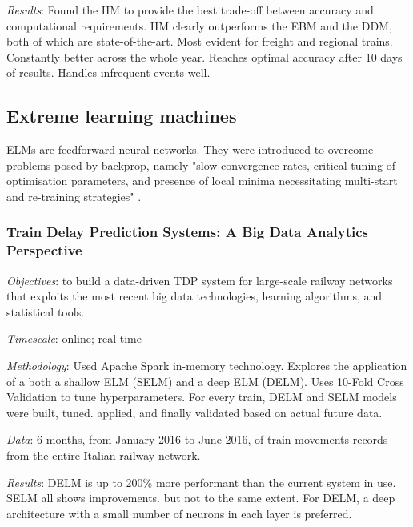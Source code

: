 \documentclass{article}
\begin{document}
\smallskip

\textit{Results}: Found the HM to provide the best trade-off between accuracy and computational requirements. HM clearly outperforms the EBM and the DDM, both of which are state-of-the-art. Most evident for freight and regional trains. Constantly better across the whole year. Reaches optimal accuracy after 10 days of results. Handles infrequent events well. 

\subsection{Extreme learning machines}

ELMs are feedforward neural networks. They were introduced to overcome problems posed by backprop, namely "slow convergence rates, critical tuning of optimisation parameters, and presence of local minima necessitating multi-start and re-training strategies" \cite{oneto_et_al_2017a}.

\subsubsection{Train Delay Prediction Systems: A Big Data Analytics Perspective \cite{oneto_et_al_2017a}}

\textit{Objectives}: to build a data-driven TDP system for large-scale railway networks that exploits the most recent big data technologies, learning algorithms, and statistical tools. 

\smallskip

\textit{Timescale}: online; real-time

\smallskip

\textit{Methodology}: Used Apache Spark in-memory technology. Explores the application of a both a shallow ELM (SELM) and a deep ELM (DELM). Uses 10-Fold Cross Validation to tune hyperparameters. For every train, DELM and SELM models were built, tuned. applied, and finally validated based on actual future data. 

\smallskip

\textit{Data}: 6 months, from January 2016 to June 2016, of train movements records from the entire Italian railway network.

\smallskip

\textit{Results}: DELM is up to 200\% more performant than the current system in use. SELM all shows improvements. but not to the same extent. For DELM, a deep architecture with a small number of neurons in each layer is preferred.
\end{document}
